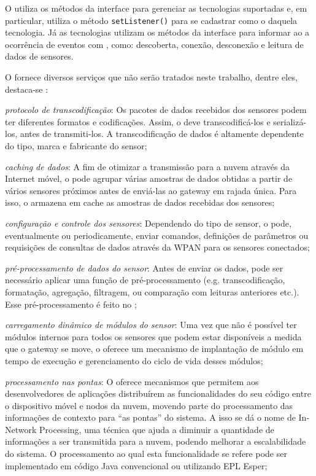 O \stwopaservice utiliza os métodos da interface \techinterface para gerenciar as tecnologias suportadas e, em particular, utiliza o método \texttt{setListener(\techlistener)} para se cadastrar como o \listener daquela tecnologia. Já as tecnologias utilizam os métodos da interface \techlistener para informar ao \stwopaservice a ocorrência de eventos com \smartobjs, como: descoberta, conexão, desconexão e leitura de dados de sensores.

O \mhub fornece diversos serviços que não serão tratados neste trabalho, dentre eles, destaca-se \cite{gomes:2017}:

\begin{alineas}
	\item \emph{protocolo de transcodificação}:
		Os pacotes de dados recebidos dos sensores podem ter diferentes formatos e codificações.  Assim, o \mhub deve transcodificá-los e serializá-los, antes de transmiti-los. A transcodificação de dados é altamente dependente do tipo, marca e fabricante do sensor;
		
	\item \emph{caching de dados}:
		A fim de otimizar a transmissão para a nuvem através da Internet móvel, o \mhub pode agrupar várias amostras de dados obtidas a partir de vários sensores próximos antes de enviá-las ao gateway em rajada única. Para isso, o \mhub armazena em cache as amostras de dados recebidas dos sensores;
		
	\item \emph{configuração e controle dos sensores}:
		Dependendo do tipo de sensor, o \mhub pode, eventualmente ou periodicamente, enviar comandos, definições de parâmetros ou requisições de consultas de dados através da WPAN para os sensores conectados;
		
	\item \emph{pré-processamento de dados do sensor}:
		Antes de enviar os dados, pode ser necessário aplicar uma função de pré-processamento (e.g.  transcodificação, formatação, agregação, filtragem, ou comparação com leituras anteriores etc.).  Esse pré-processamento é feito no \mhub;
		
	\item \emph{carregamento dinâmico de módulos do sensor}:
		Uma vez que não é possível ter módulos internos para todos os sensores que podem estar disponíveis a medida que o gateway se move, o \mhub oferece um mecanismo de implantação de módulo em tempo de execução e gerenciamento do ciclo de vida desses módulos;
		
	\item \emph{processamento nas pontas}:
		O \mhub oferece mecanismos que permitem aos desenvolvedores de aplicações distribuírem as funcionalidades do seu código entre o dispositivo móvel e nodos da nuvem, movendo parte do processamento das informações de contexto para “as pontas” do sistema. A isso se dá o nome de In-Network Processing, uma técnica que ajuda a diminuir a quantidade de informações a ser transmitida para a nuvem, podendo melhorar a escalabilidade do sistema. O processamento ao qual esta funcionalidade se refere pode ser implementado em código Java convencional ou utilizando EPL Esper;
		

\end{alineas}
